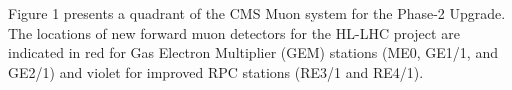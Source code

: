 Figure 1 presents a quadrant of the CMS Muon system for the Phase-2 Upgrade. The locations of new forward muon detectors for the HL-LHC project are indicated in red for Gas Electron Multiplier (GEM) stations (ME0, GE1/1, and GE2/1) and violet for improved RPC stations (RE3/1 and RE4/1).

